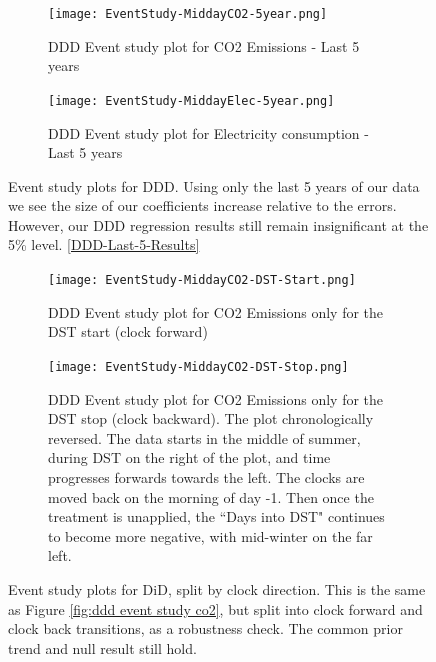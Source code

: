 \begin{figure}[ht]
    \centering
    \begin{subfigure}[t]{0.45\textwidth} 
        \texttt{[image: EventStudy-MiddayCO2-5year.png]}
        \caption{\acs{DDD} Event study plot for CO2 Emissions - Last 5 years}
        \label{fig:ddd event study co2 - Last 5}
    \end{subfigure}
    \hfill 
    \begin{subfigure}[t]{0.45\textwidth} 
        \texttt{[image: EventStudy-MiddayElec-5year.png]} 
        \caption{\acs{DDD} Event study plot for Electricity consumption - Last 5 years} %
        \label{fig:ddd event study elec - Last 5}
    \end{subfigure}
    \caption[Event study plots for \acs{DDD} using last 5 years]{Event study plots for \acs{DDD}. Using only the last 5 years of our data we see the size of our coefficients increase relative to the errors. However, our DDD regression results still remain insignificant at the 5\% level. \ref{DDD-Last-5-Results}} 
    \label{fig:ddd event study - Last 5}
\end{figure}

\begin{figure}[ht]
    \centering
    \begin{subfigure}[t]{0.45\textwidth} 
        \texttt{[image: EventStudy-MiddayCO2-DST-Start.png]}
        \caption{\acs{DDD} Event study plot for CO2 Emissions only for the DST start (clock forward)}
        \label{fig:ddd event study co2 start}
    \end{subfigure}
    \hfill 
    \begin{subfigure}[t]{0.45\textwidth} 
        \texttt{[image: EventStudy-MiddayCO2-DST-Stop.png]}
        \caption{\acs{DDD} Event study plot for CO2 Emissions only for the DST stop (clock backward). The plot chronologically reversed. The data starts in the middle of summer, during \acs{DST} on the right of the plot, and time progresses forwards towards the left. The clocks are moved back on the morning of day -1. Then once the treatment is unapplied, the ``Days into \acs{DST}" continues to become more negative, with mid-winter on the far left.} %
        \label{fig:ddd event study co2 stop}
    \end{subfigure}
    \caption[Event study plots for \acs{DiD} split by clock change direction]{Event study plots for \acs{DiD}, split by clock direction. This is the same as Figure \ref{fig:ddd event study co2}, but split into clock forward and clock back transitions, as a robustness check. The common prior trend and null result still hold.} 
    \label{fig:ddd event study co2 start stop}
\end{figure}

